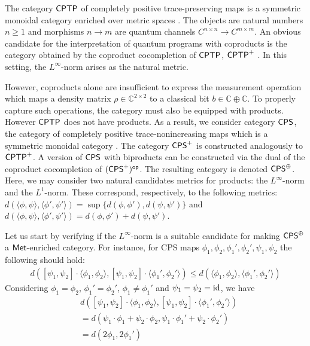 \documentclass[10pt,a4paper]{amsart}
\theoremstyle{definition}
\theoremstyle{definition}
\theoremstyle{definition}
\theoremstyle{definition}
\theoremstyle{definition}
\theoremstyle{definition}
\begin{document}
\vspace*{10pt}

The category $\mathsf{CPTP}$ of completely positive trace-preserving maps is a symmetric monoidal category enriched over metric spaces \cite{dahlqvist2023syntactic}. The objects are natural numbers $n \geq 1$ and morphisms $n \rightarrow m$ are quantum channels $C^{n \times n} \rightarrow C^{m\times m}$.  An obvious candidate for the interpretation of quantum programs with coproducts is the category obtained by the coproduct cocompletion of $\mathsf{CPTP}$,  $\mathsf{CPTP}^{+}$ . In this setting, the $L^{\infty}$-norm arises as the natural metric. 


However, coproducts alone are insufficient to express the measurement operation which maps a density matrix $ \rho \in \mathbb{C}^{2 \times 2}$ to a classical bit $b \in \mathbb{C} \oplus \mathbb{C}$. To properly capture such operations, the category must also be equipped with products. However $\mathsf{CPTP}$ does not have products. As a result, we consider category $\mathsf{CPS}$, the category of completely positive trace-nonincreasing maps which is a symmetric monoidal category  \cite{selinger04}. The category $\mathsf{CPS}^{+}$ is constructed analogously to $\mathsf{CPTP}^{+}$. A version of $\mathsf{CPS}$ with biproducts can be constructed via the dual of the coproduct cocompletion of $(\mathsf{CPS}^{+})^{\mathsf{op}}$.  The resulting category is denoted $\mathsf{CPS}^{\oplus}$. Here, we may consider two natural candidates metrics for products: the $L^{\infty}$-norm and the $L^{1}$-norm. These correspond, respectively, to the following metrics: $d(\langle \phi, \psi \rangle, \langle \phi', \psi' \rangle ) = \sup \{ d(\phi, \phi' ), d(\psi, \psi') \}$ and $d(\langle \phi, \psi \rangle, \langle \phi', \psi' \rangle ) = d(\phi, \phi' ) +  d(\psi, \psi') $.

Let us start by verifying if the  $L^{\infty}$-norm is a suitable candidate for making $\mathsf{CPS}^{\oplus}$ a $\mathsf{Met}$-enriched category. For instance, for CPS maps $\phi_1, \phi_2,  \phi_1', \phi_2', \psi_1, \psi_2$ the following should hold:
\begin{align*}
  d([\psi_1, \psi_2] \cdot \langle \phi_1, \phi_2 \rangle, [\psi_1, \psi_2] \cdot \langle \phi_1', \phi_2' \rangle ) \leq d(\langle \phi_1, \phi_2 \rangle, \langle \phi_1', \phi_2' \rangle )
\end{align*}
Considering $\phi_1=\phi_2$, $\phi_1'=\phi_2'$, $\phi_1 \neq \phi_1'$ and $\psi_1= \psi_2 = \mathrm{id}$, we have
\begin{align*}
  & d([\psi_1, \psi_2] \cdot \langle \phi_1, \phi_2 \rangle, [\psi_1, \psi_2] \cdot \langle \phi_1', \phi_2' \rangle ) \\
  & = d(\psi_1 \cdot \phi_1 + \psi_2 \cdot \phi_2, \psi_1 \cdot \phi_1' + \psi_2 \cdot \phi_2') \\
  & = d(2 \phi_1, 2 \phi_1') 
\end{align*}
\end{document}
